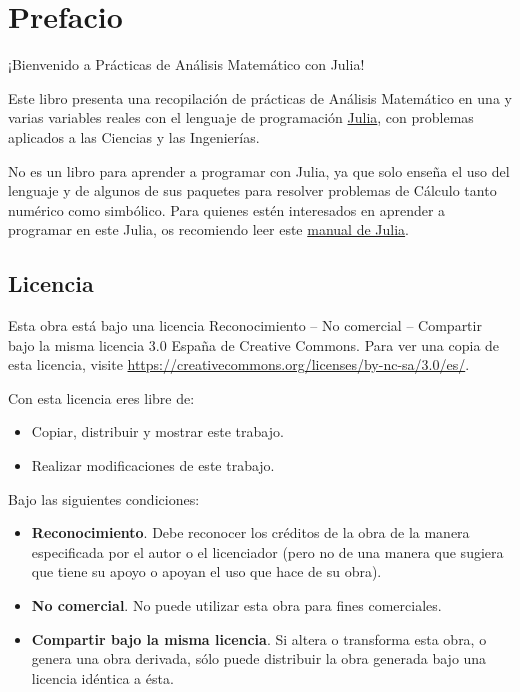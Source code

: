 \documentclass[
  a4paper,
]{scrreport}
\providecommand{\tightlist}{%
  \setlength{\itemsep}{0pt}\setlength{\parskip}{0pt}}\usepackage{longtable,booktabs,array}
\theoremstyle{definition}
\theoremstyle{remark}
\begin{document}
\hypertarget{prefacio}{%
\chapter*{Prefacio}\label{prefacio}}


¡Bienvenido a Prácticas de Análisis Matemático con Julia!

Este libro presenta una recopilación de prácticas de Análisis Matemático
en una y varias variables reales con el lenguaje de programación
\href{https://julialang.org/}{Julia}, con problemas aplicados a las
Ciencias y las Ingenierías.

No es un libro para aprender a programar con Julia, ya que solo enseña
el uso del lenguaje y de algunos de sus paquetes para resolver problemas
de Cálculo tanto numérico como simbólico. Para quienes estén interesados
en aprender a programar en este Julia, os recomiendo leer este
\href{https://aprendeconalf.es/manual-julia/}{manual de Julia}.

\hypertarget{licencia}{%
\section*{Licencia}\label{licencia}}


Esta obra está bajo una licencia Reconocimiento -- No comercial --
Compartir bajo la misma licencia 3.0 España de Creative Commons. Para
ver una copia de esta licencia, visite
\url{https://creativecommons.org/licenses/by-nc-sa/3.0/es/}.

Con esta licencia eres libre de:

\begin{itemize}
\tightlist
\item
  Copiar, distribuir y mostrar este trabajo.
\item
  Realizar modificaciones de este trabajo.
\end{itemize}

Bajo las siguientes condiciones:

\begin{itemize}
\item
  \textbf{Reconocimiento}. Debe reconocer los créditos de la obra de la
  manera especificada por el autor o el licenciador (pero no de una
  manera que sugiera que tiene su apoyo o apoyan el uso que hace de su
  obra).
\item
  \textbf{No comercial}. No puede utilizar esta obra para fines
  comerciales.
\item
  \textbf{Compartir bajo la misma licencia}. Si altera o transforma esta
  obra, o genera una obra derivada, sólo puede distribuir la obra
  generada bajo una licencia idéntica a ésta.
\end{itemize}
\end{document}
